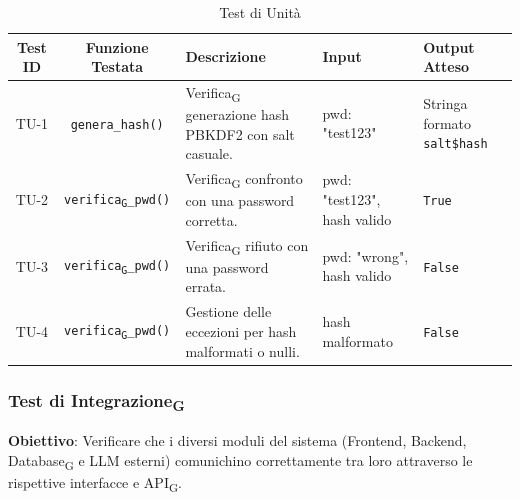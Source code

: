 \documentclass[11pt,a4paper]{article}
\newcommand{\gls}[1]{#1\textsubscript{G}}
\begin{document}
\begin{table}[H]
    \centering
    \small %
    \begin{tabularx}{\textwidth}{|c|c|X|p{2.5cm}|p{2.5cm}|}
        \hline
        \textbf{Test ID} & \textbf{Funzione Testata} & \textbf{Descrizione} & \textbf{Input} & \textbf{Output Atteso} \\
        \hline
        TU-1 & \texttt{genera\_hash()} & \gls{Verifica} generazione hash PBKDF2 con salt casuale. & pwd: "test123" & Stringa formato \texttt{salt\$hash} \\
        \hline
        TU-2 & \texttt{\gls{verifica}\_pwd()} & \gls{Verifica} confronto con una password corretta. & pwd: "test123", hash valido & \texttt{True} \\
        \hline
        TU-3 & \texttt{\gls{verifica}\_pwd()} & \gls{Verifica} rifiuto con una password errata. & pwd: "wrong", hash valido & \texttt{False} \\
        \hline
        TU-4 & \texttt{\gls{verifica}\_pwd()} & Gestione delle eccezioni per hash malformati o nulli. & hash malformato & \texttt{False} \\
        \hline
    \end{tabularx}
    \caption{Test di Unità}
\end{table}

\subsubsection{\gls{Test di Integrazione}}
\textbf{Obiettivo}: Verificare che i diversi moduli del sistema (Frontend, Backend, \gls{Database} e LLM esterni) comunichino correttamente tra loro attraverso le rispettive interfacce e \gls{API}.
\end{document}
